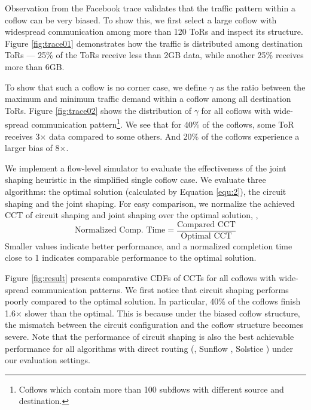 Observation from the Facebook trace validates that the traffic pattern within a coflow can be very biased.
To show this, we first select a large coflow with widespread communication among more than 120 ToRs and inspect its structure. Figure \ref{fig:trace01} demonstrates how the traffic is distributed among destination ToRs --- 25\% of the ToRs receive less than 2GB data, while another 25\% receives more than 6GB.

To show that such a coflow is no corner case, we define $\gamma$
as the ratio between the maximum and minimum traffic demand within a coflow among all destination ToRs.
Figure \ref{fig:trace02} shows the distribution of $\gamma$ for all coflows with wide-spread communication pattern\footnote{
Coflows which contain more than 100 subflows with different source and destination.}.
We see that for 40\% of the coflows, some ToR receives 3$\times$ data compared to some others.
And 20\% of the coflows experience a larger bias of 8$\times$.


We implement a flow-level simulator to evaluate the effectiveness of the joint shaping heuristic in the simplified single coflow case. We evaluate three algorithms: the optimal solution (calculated by Equation \ref{equ:2}), the circuit shaping and the joint shaping. For easy comparison, we normalize
the achieved CCT of circuit shaping and joint shaping over the optimal solution, \ie,
\begin{equation*}
\text{Normalized Comp. Time} = \frac{\text{Compared CCT}}{\text{Optimal CCT}}
\end{equation*}
Smaller values indicate better performance, and a normalized completion time close to 1 indicates comparable performance to the optimal solution.



Figure \ref{fig:result} presents comparative CDFs of CCTs for
all coflows with wide-spread communication patterns.
We first notice that circuit shaping performs poorly compared to the optimal solution. In particular, 40\% of the coflows finish 1.6$\times$ slower than the optimal.
This is because under the biased coflow structure, the mismatch between the circuit configuration and the coflow structure becomes severe. Note that the performance of circuit shaping is also the best achievable performance for all algorithms with direct routing (\eg, Sunflow \cite{sunflow}, Solstice \cite{solstice}) under our evaluation settings.


